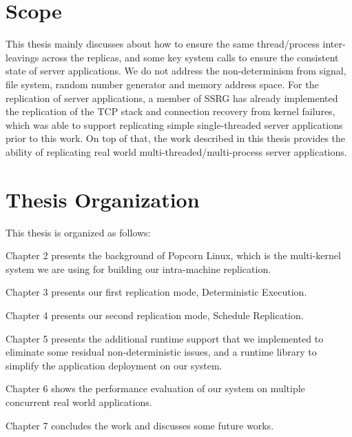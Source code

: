 \section{Scope}
This thesis mainly discusses about how to ensure the same thread/process inter-leavings across the replicas, and some key system calls to ensure the consistent state of server applications. We do not address the non-determinism from signal, file system, random number generator and memory address space. For the replication of server applications, a member of SSRG has already implemented the replication of the TCP stack and connection recovery from kernel failures, which was able to support replicating simple single-threaded server applications prior to this work. On top of that, the work described in this thesis provides the ability of replicating real world multi-threaded/multi-process server applications.

\section{Thesis Organization}
This thesis is organized as follows:

Chapter 2 presents the background of Popcorn Linux, which is the multi-kernel system we are using for building our intra-machine replication.

Chapter 3 presents our first replication mode, Deterministic Execution. 

Chapter 4 presents our second replication mode, Schedule Replication.

Chapter 5 presents the additional runtime support that we implemented to eliminate some residual non-deterministic issues, and a runtime library to simplify the application deployment on our system.

Chapter 6 shows the performance evaluation of our system on multiple concurrent real world applications.

Chapter 7 concludes the work and discusses some future works.